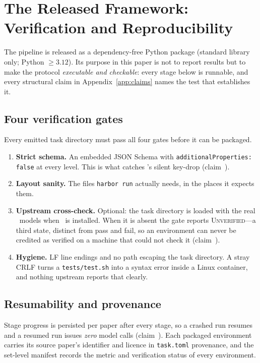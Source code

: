 \section{The Released Framework: Verification and Reproducibility}
\label{sec:artifact}

The pipeline is released as a dependency-free Python package (standard library
only; Python $\geq 3.12$). Its purpose in this paper is not to report results
but to make the protocol \emph{executable and checkable}: every stage below is
runnable, and every structural claim in Appendix~\ref{app:claims} names the test
that establishes it.

\subsection{Four verification gates}
\label{sec:gates}

Every emitted task directory must pass all four gates before it can be
packaged.

\begin{enumerate}
  \item \textbf{Strict schema.} An embedded JSON Schema with
        \texttt{additionalProperties: false} at every level. This is what
        catches \harbor's silent key-drop (claim~).
  \item \textbf{Layout sanity.} The files \texttt{harbor run} actually needs,
        in the places it expects them.
  \item \textbf{Upstream cross-check.} Optional: the task directory is loaded
        with the real \harbor\ models when \harbor\ is installed. When it is
        absent the gate reports \textsc{Unverified}---a third state, distinct
        from pass and fail, so an environment can never be credited as verified
        on a machine that could not check it (claim~).
  \item \textbf{Hygiene.} LF line endings and no path escaping the task
        directory. A stray CRLF turns a \texttt{tests/test.sh} into a syntax
        error inside a Linux container, and nothing upstream reports that
        clearly.
\end{enumerate}

\subsection{Resumability and provenance}

Stage progress is persisted per paper after every stage, so a crashed run
resumes and a resumed run issues \emph{zero} model calls (claim~). Each
packaged environment carries its source paper's identifier and licence in
\texttt{task.toml} provenance, and the set-level manifest records the metric and
verification status of every environment.

